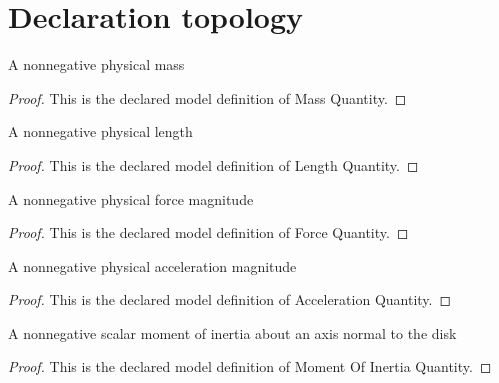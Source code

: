 \section{Declaration topology}
\begin{definition}
  \label{def:physics:phyx-mini-0705:phyxminiproblems-problemphyxmini0705-massquantity}
  A nonnegative physical mass
\end{definition}
\begin{proof}
  This is the declared model definition of Mass Quantity.
\end{proof}
\begin{definition}
  \label{def:physics:phyx-mini-0705:phyxminiproblems-problemphyxmini0705-lengthquantity}
  A nonnegative physical length
\end{definition}
\begin{proof}
  This is the declared model definition of Length Quantity.
\end{proof}
\begin{definition}
  \label{def:physics:phyx-mini-0705:phyxminiproblems-problemphyxmini0705-forcequantity}
  A nonnegative physical force magnitude
\end{definition}
\begin{proof}
  This is the declared model definition of Force Quantity.
\end{proof}
\begin{definition}
  \label{def:physics:phyx-mini-0705:phyxminiproblems-problemphyxmini0705-accelerationquantity}
  A nonnegative physical acceleration magnitude
\end{definition}
\begin{proof}
  This is the declared model definition of Acceleration Quantity.
\end{proof}
\begin{definition}
  \label{def:physics:phyx-mini-0705:phyxminiproblems-problemphyxmini0705-momentofinertiaquantity}
  A nonnegative scalar moment of inertia about an axis normal to the disk
\end{definition}
\begin{proof}
  This is the declared model definition of Moment Of Inertia Quantity.
\end{proof}
